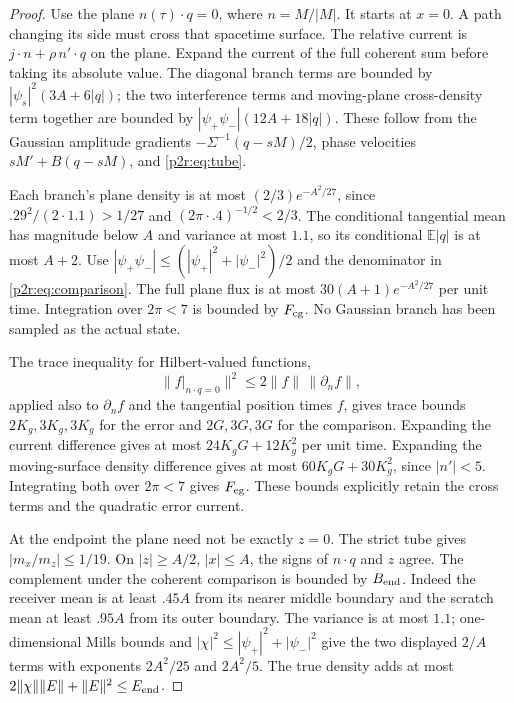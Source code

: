 \documentclass[11pt]{article}
\numberwithin{equation}{section}
\theoremstyle{definition}
\theoremstyle{remark}
\begin{document}
\begin{proof}
Use the plane $n(\tau)\cdot q=0$, where $n=M/|M|$.
It starts at $x=0$. A path changing its side must cross that
spacetime surface. The relative current is
$j\cdot n+\rho\,n'\cdot q$ on the plane.
Expand the current of the full coherent sum before taking its
absolute value. The diagonal branch terms are bounded by
$|\psi_s|^2(3A+6|q|)$; the two interference terms and
moving-plane cross-density term together are bounded by
$|\psi_+\psi_-|(12A+18|q|)$.
These follow from the Gaussian amplitude gradients
$-\Sigma^{-1}(q-sM)/2$, phase velocities
$sM'+B(q-sM)$, and \eqref{p2r:eq:tube}.

Each branch's plane density is at most
$(2/3)e^{-A^2/27}$, since
$.29^2/(2\cdot1.1)>1/27$ and
$(2\pi\cdot.4)^{-1/2}<2/3$.
The conditional tangential mean has magnitude below $A$ and
variance at most $1.1$, so its conditional $\mathbb E|q|$ is
at most $A+2$.
Use $|\psi_+\psi_-|\leq(|\psi_+|^2+|\psi_-|^2)/2$
and the denominator in \eqref{p2r:eq:comparison}. The full
plane flux is at most $30(A+1)e^{-A^2/27}$ per unit time.
Integration over $2\pi<7$ is bounded by $F_{\rm cg}$.
No Gaussian branch has been sampled as the actual state.

The trace inequality for Hilbert-valued functions,
\[
 \|f|_{n\cdot q=0}\|^2
       \leq2\|f\|\,\|\partial_nf\|,
\]
applied also to $\partial_nf$ and the tangential position times
$f$, gives trace bounds $2K_g,3K_g,3K_g$ for the error and
$2G,3G,3G$ for the comparison.
Expanding the current difference gives at most
$24K_gG+12K_g^2$ per unit time. Expanding the moving-surface
density difference gives at most $60K_gG+30K_g^2$, since
$|n'|<5$. Integrating both over $2\pi<7$ gives $F_{\rm eg}$.
These bounds explicitly retain the cross terms and the
quadratic error current.

At the endpoint the plane need not be exactly $z=0$.
The strict tube gives $|m_x/m_z|\leq1/19$.
On $|z|\geq A/2$, $|x|\leq A$, the signs of $n\cdot q$
and $z$ agree. The complement under the coherent comparison is
bounded by $B_{\rm end}$. Indeed the receiver mean is at least
$.45A$ from its nearer middle boundary and the scratch mean at
least $.95A$ from its outer boundary. The variance is at most
$1.1$; one-dimensional Mills bounds and
$|\chi|^2\leq|\psi_+|^2+|\psi_-|^2$ give the two displayed
$2/A$ terms with exponents $2A^2/25$ and $2A^2/5$.
The true density adds at most
$2\|\chi\|\|E\|+\|E\|^2\leq E_{\rm end}$.


\end{proof}
\end{document}

